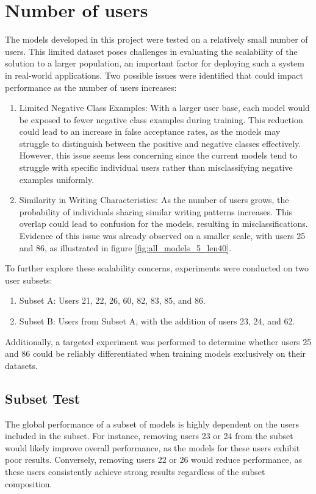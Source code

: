 \section{Number of users}
The models developed in this project were tested on a relatively small number of users. This limited dataset poses challenges in evaluating the scalability of the solution to a larger population, an important factor for deploying such a system in real-world applications. Two possible issues were identified that could impact performance as the number of users increases:
\begin{enumerate}
	\item Limited Negative Class Examples: With a larger user base, each model would be exposed to fewer negative class examples during training. This reduction could lead to an increase in false acceptance rates, as the models may struggle to distinguish between the positive and negative classes effectively.  However, this issue seems less concerning since the current models tend to struggle with specific individual users rather than misclassifying negative examples uniformly.
	
	\item Similarity in Writing Characteristics: As the number of users grows, the probability of individuals sharing similar writing patterns increases. This overlap could lead to confusion for the models, resulting in misclassifications. Evidence of this issue was already observed on a smaller scale, with users 25 and 86, as illustrated in figure \ref{fig:all_models_5_len40}.
\end{enumerate}

To further explore these scalability concerns, experiments were conducted on two user subsets:
\begin{enumerate}
	\item Subset A: Users 21, 22, 26, 60, 82, 83, 85, and 86.
	\item Subset B: Users from Subset A, with the addition of users 23, 24, and 62.
\end{enumerate}

Additionally, a targeted experiment was performed to determine whether users 25 and 86 could be reliably differentiated when training models exclusively on their datasets.

\subsection{Subset Test}
The global performance of a subset of models is highly dependent on the users included in the subset. For instance, removing users 23 or 24 from the subset would likely improve overall performance, as the models for these users exhibit poor results. Conversely, removing users 22 or 26 would reduce performance, as these users consistently achieve strong results regardless of the subset composition.

